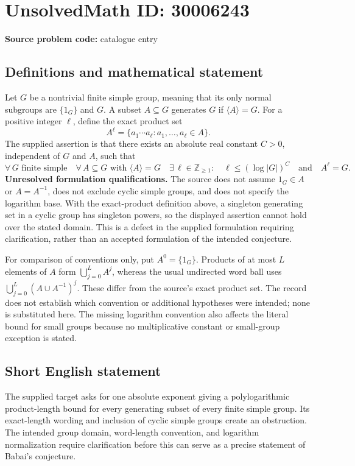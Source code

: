 \documentclass[11pt]{article}
\begin{document}
\section*{UnsolvedMath ID: 30006243}
\textbf{Source problem code:} catalogue entry
\subsection{Definitions and mathematical statement}
Let \(G\) be a nontrivial finite simple group, meaning that its only normal subgroups are \(\{1_G\}\) and \(G\). A subset \(A\subseteq G\) generates \(G\) if \(\langle A\rangle=G\). For a positive integer \(\ell\), define the exact product set
\[
A^\ell=\{a_1\cdots a_\ell:a_1,\ldots,a_\ell\in A\}.
\]
The supplied assertion is that there exists an absolute real constant \(C>0\), independent of \(G\) and \(A\), such that
\[
\forall\,G\text{ finite simple}\quad
\forall\,A\subseteq G\text{ with }\langle A\rangle=G\quad
\exists\,\ell\in\mathbb Z_{\geq1}:
\quad \ell\leq(\log|G|)^C\quad\text{and}\quad A^\ell=G.
\]
\textbf{Unresolved formulation qualifications.} The source does not assume \(1_G\in A\) or \(A=A^{-1}\), does not exclude cyclic simple groups, and does not specify the logarithm base. With the exact-product definition above, a singleton generating set in a cyclic group has singleton powers, so the displayed assertion cannot hold over the stated domain. This is a defect in the supplied formulation requiring clarification, rather than an accepted formulation of the intended conjecture.

For comparison of conventions only, put \(A^0=\{1_G\}\). Products of at most \(L\) elements of \(A\) form \(\bigcup_{j=0}^{L}A^j\), whereas the usual undirected word ball uses \(\bigcup_{j=0}^{L}(A\cup A^{-1})^j\). These differ from the source's exact product set. The record does not establish which convention or additional hypotheses were intended; none is substituted here. The missing logarithm convention also affects the literal bound for small groups because no multiplicative constant or small-group exception is stated.
\subsection{Short English statement}
The supplied target asks for one absolute exponent giving a polylogarithmic product-length bound for every generating subset of every finite simple group. Its exact-length wording and inclusion of cyclic simple groups create an obstruction. The intended group domain, word-length convention, and logarithm normalization require clarification before this can serve as a precise statement of Babai's conjecture.
\end{document}
